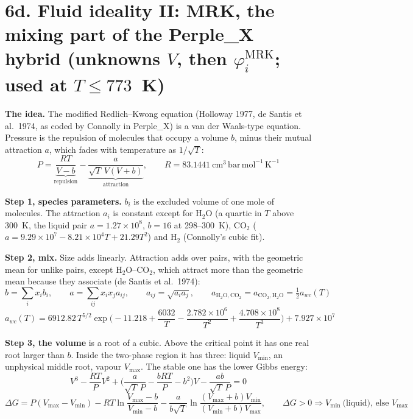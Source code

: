 \documentclass[11pt]{article}
\begin{document}
\vspace*{\fill}
\iffalse
\clearpage
\section*{6d. Fluid ideality II: MRK, the mixing part of the Perple\_X hybrid \quad (unknowns $ V$, then $\varphi_i^{\mathrm{MRK}}$; used at $T\le773$~K)}
{\small\setlength{\abovedisplayskip}{2pt}\setlength{\belowdisplayskip}{2pt}
\begin{minipage}[t]{0.60\linewidth}
\textbf{The idea.} The modified Redlich--Kwong equation (Holloway 1977, de Santis et al.\ 1974, as coded by Connolly in Perple\_X) is a van der Waals-type equation. Pressure is the repulsion of molecules that occupy a volume $b$, minus their mutual attraction $a$, which fades with temperature as $1/\sqrt T$:
\begin{equation}
  P=\underbrace{\frac{RT}{V-b}}_{\text{repulsion}}-\underbrace{\frac{a}{\sqrt T\,V(V+b)}}_{\text{attraction}},\qquad R=83.1441\ \mathrm{cm^3\,bar\,mol^{-1}\,K^{-1}}
\end{equation}

\textbf{Step 1, species parameters.} $b_i$ is the excluded volume of one mole of molecules. The attraction $a_i$ is constant except for H$_2$O (a quartic in $T$ above 300~K, the liquid pair $a=1.27\times10^8$, $b=16$ at 298--300~K), CO$_2$ ($a=9.29\times10^7-8.21\times10^4T+21.29T^2$) and H$_2$ (Connolly's cubic fit).

\textbf{Step 2, mix.} Size adds linearly. Attraction adds over pairs, with the geometric mean for unlike pairs, except H$_2$O--CO$_2$, which attract more than the geometric mean because they associate (de Santis et al.\ 1974):
\begin{equation}
  b=\sum_ix_ib_i,\qquad a=\sum_{ij}x_ix_ja_{ij},\qquad a_{ij}=\sqrt{a_ia_j},\qquad a_{\mathrm{H_2O,CO_2}}=a_{\mathrm{CO_2,H_2O}}=\tfrac12a_{wc}(T)
\end{equation}
\begin{equation}
  a_{wc}(T)=6912.82\,T^{5/2}\exp\Big(-11.218+\frac{6032}{T}-\frac{2.782\times10^6}{T^2}+\frac{4.708\times10^8}{T^3}\Big)+7.927\times10^7
\end{equation}

\textbf{Step 3, the volume} is a root of a cubic. Above the critical point it has one real root larger than $b$. Inside the two-phase region it has three: liquid $V_{\min}$, an unphysical middle root, vapour $V_{\max}$. The stable one has the lower Gibbs energy:
\begin{equation}
   V^3-\frac{RT}{ P} V^2+\Big(\frac{a}{\sqrt{ T}\, P}-\frac{bRT}{ P}-b^2\Big) V-\frac{ab}{\sqrt{ T}\, P}=0
\end{equation}
\begin{equation}
  \Delta G=P(V_{\max}-V_{\min})-RT\ln\frac{V_{\max}-b}{V_{\min}-b}-\frac{a}{b\sqrt T}\ln\frac{(V_{\max}+b)V_{\min}}{(V_{\min}+b)V_{\max}},\qquad
  \Delta G>0\Rightarrow V_{\min}\ \text{(liquid), else }V_{\max}
\end{equation}


\end{minipage}}
\end{document}
